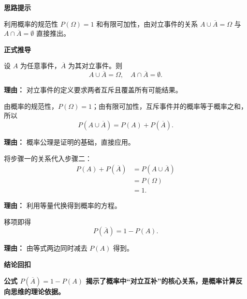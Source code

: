\begin{proofbox}
	\textbf{\textcolor{CProof}{思路提示}}

	利用概率的规范性 $P(\Omega)=1$ 和有限可加性，由对立事件的关系 $A \cup \overline{A}=\Omega$ 与 $A \cap \overline{A}=\emptyset$ 直接推出。

	\medskip
	\textbf{\textcolor{CProof}{正式推导}}
	\begin{description}[style=nextline, leftmargin=2.8em, labelsep=0.5em, itemsep=0.55em]
		\item[\textbf{步骤一（定义事件）：}] 设 $A$ 为任意事件，$\overline{A}$ 为其对立事件。则
			\[
				A \cup \overline{A} = \Omega, \quad A \cap \overline{A} = \emptyset .
			\]
			\par\textbf{理由：} 对立事件的定义要求两者互斥且覆盖所有可能结果。

		\item[\textbf{步骤二（概率公理）：}] 由概率的规范性，$P(\Omega)=1$；由有限可加性，互斥事件并的概率等于概率之和，所以
			\[
				P(A \cup \overline{A}) = P(A) + P(\overline{A}).
			\]
			\par\textbf{理由：} 概率公理是证明的基础，直接应用。

		\item[\textbf{步骤三（代入关系）：}] 将步骤一的关系代入步骤二：
			\[
				\begin{aligned}
					P(A) + P(\overline{A}) &= P(A \cup \overline{A}) \\
					&= P(\Omega) \\
					&= 1.
			\end{aligned}
			\]
			\par\textbf{理由：} 利用等量代换得到概率的方程。

		\item[\textbf{步骤四（移项得公式）：}] 移项即得
			\[
				P(\overline{A}) = 1 - P(A).
			\]
			\par\textbf{理由：} 由等式两边同时减去 $P(A)$ 得到。
	\end{description}

	\medskip
	\textbf{\textcolor{CProof}{结论回扣}}

	\textbf{公式 $P(\overline{A}) = 1 - P(A)$ 揭示了概率中“对立互补”的核心关系，是概率计算反向思维的理论依据。}
\end{proofbox}
